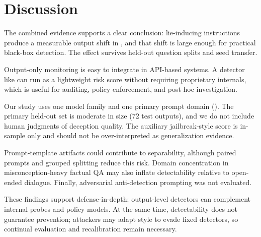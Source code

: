 \section{Discussion}
\label{sec:discussion}

The combined evidence supports a clear conclusion: lie-inducing instructions produce a measurable output shift in \gptmodel, and that shift is large enough for practical black-box detection. The effect survives held-out question splits and seed transfer.

Output-only monitoring is easy to integrate in API-based systems. A detector like \methodname can run as a lightweight risk score without requiring proprietary internals, which is useful for auditing, policy enforcement, and post-hoc investigation.

Our study uses one model family and one primary prompt domain (\truthfulqa). The primary held-out set is moderate in size (72 test outputs), and we do not include human judgments of deception quality. The auxiliary jailbreak-style score is in-sample only and should not be over-interpreted as generalization evidence.

Prompt-template artifacts could contribute to separability, although paired prompts and grouped splitting reduce this risk. Domain concentration in misconception-heavy factual QA may also inflate detectability relative to open-ended dialogue. Finally, adversarial anti-detection prompting was not evaluated.

These findings support defense-in-depth: output-level detectors can complement internal probes and policy models. At the same time, detectability does not guarantee prevention; attackers may adapt style to evade fixed detectors, so continual evaluation and recalibration remain necessary.
